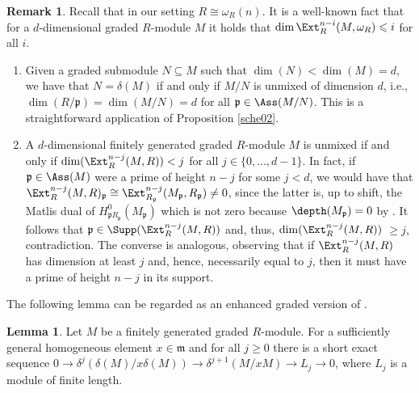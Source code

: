 \documentclass[12pt]{amsart}
\theoremstyle{definition}
\newtheorem{lemma}[theorem]{Lemma}
\theoremstyle{definition}
\newtheorem{remark}[theorem]{Remark}
\newcommand{\m}{\mathfrak{m}}
\def\frk{\mathfrak}               %
\def\pp{{\frk p}}
\renewcommand{\leq}{\leqslant}
\renewcommand{\geq}{\geqslant}
\begin{document}
\begin{remark} \label{remark jsCM}  Recall that in our setting $R\cong \omega_R(n)$. It is a well-known fact that for a $d$-dimensional graded $R$-module $M$ it holds that   $\dim \Ext^{n-i}_R(M,\omega_R)\leq i$ for all $i$.
\begin{enumerate}[(1)]
\item Given a graded submodule  $N\subseteq M$  such that $\dim(N) < \dim(M)=d$, we have that $N=\delta(M)$ if and only if $M/N$ is unmixed of dimension $d$, i.e., $\dim(R/\pp) = \dim(M/N) = d$ for all $\pp \in \Ass(M/N)$. This is a straightforward application of  Proposition \ref{sche02}.
\item A $d$-dimensional finitely generated graded $R$-module $M$ is unmixed if and only if \linebreak $\dim(\Ext^{n-j}_R(M,R)) < j$ for all $j \in \{0,\ldots,d-1\}$. In fact,  if $\pp \in \Ass(M)$ were a prime of height $n-j$ for some $j<d$, we would have that $\Ext^{n-j}_R(M,R)_\pp \cong \Ext^{n-j}_{R_\pp}(M_\pp,R_\pp) \ne 0$, since the latter is, up to shift, the Matlis dual of $H^0_{\pp R_\pp}(M_\pp)$ which is not zero because $\depth(M_\pp)=0$ by \cite[Proposition 1.2.13]{BH93}. It follows that $\pp \in \Supp(\Ext^{n-j}_R(M,R))$ and, thus, $\dim(\Ext^{n-j}_R(M,R))$ $\geq j$, contradiction. The converse is analogous, observing that if $\Ext^{n-j}_R(M,R)$ has dimension at least $j$ and, hence, necessarily equal to $j$, then it must have a prime of  height $n-j$ in its support. 
\end{enumerate}
\end{remark}


The following lemma can be regarded as an enhanced graded version of \cite[Proposition 4.16]{CP17}.
    
    
\begin{lemma} \label{lemma finite length} Let $M$ be a finitely generated graded $R$-module. For a sufficiently general homogeneous element $x \in \m$ and for all $j \geq 0$  there is a short exact sequence $0 \to \delta^j(\delta(M)/x\delta(M)) \to \delta^{j+1}(M/xM) \to L_j \to 0$, where $L_j$ is a module of finite length. %
    
\end{lemma}
\end{document}
